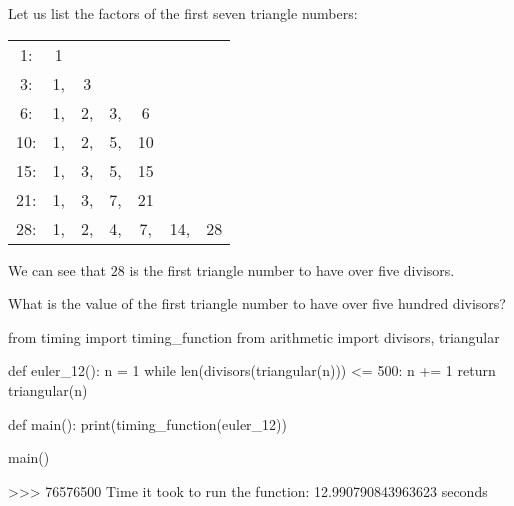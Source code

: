 \documentclass[11pt]{article}
\begin{document}
Let us list the factors of the first seven triangle numbers:
\par\medskip
\begin{tabular}{ccccccc}
 1:  & 1  &     &     &      &       &\\
 3:  &1,  & 3  &     &      &        &\\
 6:  &1,  & 2, & 3, & 6   &       &\\
10: & 1, & 2, & 5, & 10 &       &\\
15: & 1, & 3, & 5, & 15 &       &\\
21: & 1, & 3, & 7, &21  &       & \\
28: & 1, &2,  & 4, &7,   & 14, &28
\end{tabular}
\par\medskip
We can see that $28$ is the first triangle number to have over five divisors.
\par
What is the value of the first triangle number to have over five hundred divisors?
\begin{code}
from timing import timing_function
from arithmetic import divisors, triangular


def euler_12():
    n = 1
    while len(divisors(triangular(n))) <= 500:
        n += 1
    return triangular(n)


def main():
    print(timing_function(euler_12))

main()
\end{code}

\begin{shell}
>>> 
76576500
Time it took to run the function: 12.990790843963623 seconds
\end{shell}
           
\end{document}
